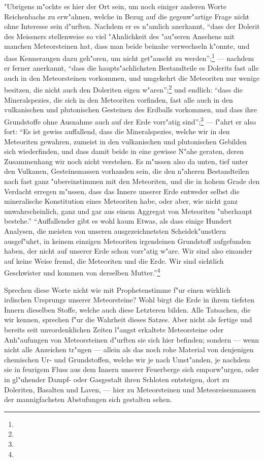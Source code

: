 \documentclass[a4paper, 8pt, oneside, polutonikogreek, german]{article}
\begin{document}
"Ubrigens m"ochte es hier der Ort sein, um noch einiger anderen Worte Reichenbachs zu erw"ahnen, welche in Bezug auf die gegenw"artige Frage nicht ohne Interesse sein d"urften. Nachdem er es n"amlich anerkannt, "`dass der Dolerit des Meissners stellenweise so viel "Ahnlichkeit des "au"seren Ansehens mit manchen Meteorsteinen hat, dass man beide beinahe verwechseln k"onnte, und dass Kenneraugen dazu geh"oren, um nicht get"auscht zu werden"';\footnote{} --- nachdem er ferner anerkannt, "`dass die haupts"achlichsten Bestandteile es Dolerits fast alle auch in den Meteorsteinen vorkommen, und umgekehrt die Meteoriten nur wenige besitzen, die nicht auch den Doleriten eigen w"aren"';\footnote{} und endlich: "`dass die Mineralspezies, die sich in den Meteoriten vorfinden, fast alle auch in den vulkanischen und plutonischen Gesteinen des Erdballs vorkommen, und dass ihre Grundstoffe ohne Ausnahme auch auf der Erde vorr"atig sind"';\footnote{} --- f"ahrt er also fort: "`Es ist gewiss auffallend, dass die Mineralspezies, welche wir in den Meteoriten gewahren, zumeist in den vulkanischen und plutonischen Gebilden sich wiederfinden, und dass damit beide in eine gewisse N"ahe geraten, deren Zusammenhang wir noch nicht verstehen. Es m"ussen also da unten, tief unter den Vulkanen, Gesteinsmassen vorhanden sein, die den n"aheren Bestandteilen nach fast ganz "ubereinstimmen mit den Meteoriten, und die in hohem Grade den Verdacht erregen m"ussen, dass das Innere unserer Erde entweder selbst die mineralische Konstitution eines Meteoriten habe, oder aber, wie nicht ganz unwahrscheinlich, ganz und gar aus einem Aggregat von Meteoriten "uberhaupt bestehe."' "`Auffallender gibt es wohl kaum Etwas, als dass einige Hundert Analysen, die meisten von unseren ausgezeichnetsten Scheidek"unstlern ausgef"uhrt, in keinem einzigen Meteoriten irgendeinen Grundstoff aufgefunden haben, der nicht auf unserer Erde schon vorr"atig w"are. Wir sind also einander auf keine Weise fremd, die Meteoriten und die Erde. Wir sind sichtlich Geschwister und kommen von derselben Mutter."'\footnote{}

Sprechen diese Worte nicht wie mit Prophetenstimme f"ur einen wirklich irdischen Ursprungs unserer Meteorsteine? Wohl birgt die Erde in ihrem tiefsten Innern dieselben Stoffe, welche auch diese Letzteren bilden. Alle Tatsachen, die wir kennen, sprechen f"ur die Wahrheit dieses Satzes. Aber nicht als fertige und bereits seit unvordenklichen Zeiten l"angst erkaltete Meteorsteine oder Anh"aufungen von Meteorsteinen d"urften sie sich hier befinden; sondern --- wenn nicht alle Anzeichen tr"ugen --- allein als das noch rohe Material von denjenigen chemischen Ur- und Grundstoffen, welche wir je nach Umst"anden, je nachdem sie in feurigem Fluss aus dem Innern unserer Feuerberge sich emporw"urgen, oder in gl"uhender Dampf- oder Gasgestalt ihren Schloten entsteigen, dort zu Doleriten, Basalten und Laven, --- hier zu Meteorsteinen und Meteoreisenmassen der mannigfachsten Abstufungen sich gestalten sehen.
\end{document}
